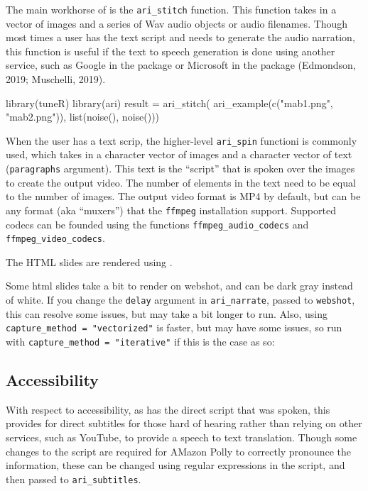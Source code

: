 The main workhorse of  is the \texttt{ari\_stitch} function.
This function takes in a vector of images and a series of Wav audio
objects or audio filenames. Though most times a user has the text script
and needs to generate the audio narration, this function is useful if
the text to speech generation is done using another service, such as
Google in the  package or Microsoft in the
 package (Edmondson, 2019; Muschelli, 2019).

\begin{Schunk}
\begin{Sinput}
library(tuneR)
library(ari)
result = ari_stitch(
  ari_example(c("mab1.png", "mab2.png")),
  list(noise(), noise()))
\end{Sinput}
\end{Schunk}

When the user has a text scrip, the higher-level \texttt{ari\_spin}
functioni is commonly used, which takes in a character vector of images
and a character vector of text (\texttt{paragraphs} argument). This text
is the ``script'' that is spoken over the images to create the output
video. The number of elements in the text need to be equal to the number
of images. The output video format is MP4 by default, but can be any
format (aka ``muxers'') that the \texttt{ffmpeg} installation support.
Supported codecs can be founded using the functions
\texttt{ffmpeg\_audio\_codecs} and \texttt{ffmpeg\_video\_codecs}.

The HTML slides are rendered using .

Some html slides take a bit to render on webshot, and can be dark gray
instead of white. If you change the \texttt{delay} argument in
\texttt{ari\_narrate}, passed to \texttt{webshot}, this can resolve some
issues, but may take a bit longer to run. Also, using
\texttt{capture\_method\ =\ "vectorized"} is faster, but may have some
issues, so run with \texttt{capture\_method\ =\ "iterative"} if this is
the case as so:

\hypertarget{accessibility}{%
\subsection{Accessibility}\label{accessibility}}

With respect to accessibility, as  has the direct script that
was spoken, this provides for direct subtitles for those hard of hearing
rather than relying on other services, such as YouTube, to provide a
speech to text translation. Though some changes to the script are
required for AMazon Polly to correctly pronounce the information, these
can be changed using regular expressions in the script, and then passed
to \texttt{ari\_subtitles}.

